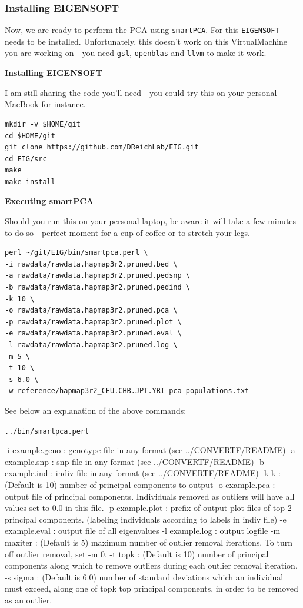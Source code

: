 \documentclass[
]{book}
\begin{document}
\hypertarget{installing-eigensoft}{%
\subsubsection{Installing EIGENSOFT}\label{installing-eigensoft}}

Now, we are ready to perform the PCA using \texttt{smartPCA}. For this \texttt{EIGENSOFT} needs to be installed. Unfortunately, this doesn't work on this VirtualMachine you are working on - you need \texttt{gsl}, \texttt{openblas} and \texttt{llvm} to make it work.

\textbf{Installing EIGENSOFT}

I am still sharing the code you'll need - you could try this on your personal MacBook for instance.

\begin{verbatim}
mkdir -v $HOME/git
cd $HOME/git
git clone https://github.com/DReichLab/EIG.git
cd EIG/src
make
make install
\end{verbatim}

\textbf{Executing smartPCA}

Should you run this on your personal laptop, be aware it will take a few minutes to do so - perfect moment for a cup of coffee or to stretch your legs.

\begin{verbatim}
perl ~/git/EIG/bin/smartpca.perl \
-i rawdata/rawdata.hapmap3r2.pruned.bed \
-a rawdata/rawdata.hapmap3r2.pruned.pedsnp \
-b rawdata/rawdata.hapmap3r2.pruned.pedind \
-k 10 \
-o rawdata/rawdata.hapmap3r2.pruned.pca \
-p rawdata/rawdata.hapmap3r2.pruned.plot \
-e rawdata/rawdata.hapmap3r2.pruned.eval \
-l rawdata/rawdata.hapmap3r2.pruned.log \
-m 5 \
-t 10 \
-s 6.0 \
-w reference/hapmap3r2_CEU.CHB.JPT.YRI-pca-populations.txt
\end{verbatim}

See below an explanation of the above commands:

\texttt{../bin/smartpca.perl}

-i example.geno : genotype file in any format (see ../CONVERTF/README)
-a example.snp : snp file in any format (see ../CONVERTF/README)
-b example.ind : indiv file in any format (see ../CONVERTF/README)
-k k : (Default is 10) number of principal components to output
-o example.pca : output file of principal components. Individuals removed
as outliers will have all values set to 0.0 in this file.
-p example.plot : prefix of output plot files of top 2 principal components.
(labeling individuals according to labels in indiv file)
-e example.eval : output file of all eigenvalues
-l example.log : output logfile
-m maxiter : (Default is 5) maximum number of outlier removal iterations.
To turn off outlier removal, set -m 0.
-t topk : (Default is 10) number of principal components along which
to remove outliers during each outlier removal iteration.
-s sigma : (Default is 6.0) number of standard deviations which an
individual must exceed, along one of topk top principal
components, in order to be removed as an outlier.
\end{document}
